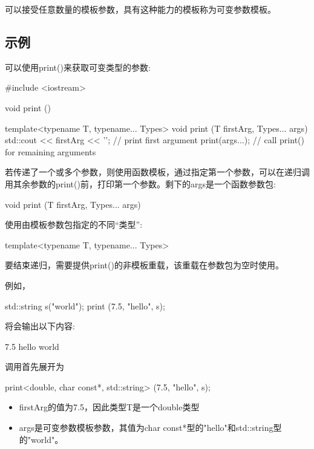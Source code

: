 

可以接受任意数量的模板参数，具有这种能力的模板称为可变参数模板。

\subsection{示例}

可以使用print()来获取可变类型的参数:

\begin{cpp}
#include <iostream>

void print ()
{
}

template<typename T, typename... Types>
void print (T firstArg, Types... args)
{
	std::cout << firstArg << '\n'; // print first argument
	print(args...); // call print() for remaining arguments
}
\end{cpp}

若传递了一个或多个参数，则使用函数模板，通过指定第一个参数，可以在递归调用其余参数的print()前，打印第一个参数。剩下的args是一个函数参数包:

\begin{cpp}
void print (T firstArg, Types... args)
\end{cpp}

使用由模板参数包指定的不同“类型”:

\begin{cpp}
template<typename T, typename... Types>
\end{cpp}

要结束递归，需要提供print()的非模板重载，该重载在参数包为空时使用。

例如，

\begin{cpp}
std::string s("world");
print (7.5, "hello", s);
\end{cpp}

将会输出以下内容:

\begin{shell}
7.5
hello
world
\end{shell}

调用首先展开为

\begin{cpp}
print<double, char const*, std::string> (7.5, "hello", s);
\end{cpp}

\begin{itemize}
\item 
firstArg的值为7.5，因此类型T是一个double类型

\item 
args是可变参数模板参数，其值为char const*型的"hello"和std::string型的"world"。
\end{itemize}

